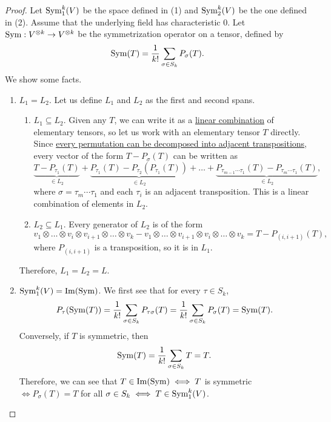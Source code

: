 	\begin{proof}
		Let $\operatorname{Sym}^k_1(V)$ be the space defined in (1) and $\operatorname{Sym}^k_2(V)$ be the one defined in (2). Assume that the underlying field has characteristic $0$. Let $\operatorname{Sym}: V^{\otimes k} \to V^{\otimes k}$ be the symmetrization operator on a tensor, defined by
		\begin{equation}
			\operatorname{Sym}(T) = \frac{1}{k!} \sum_{\sigma \in S_k} P_\sigma(T).
		\end{equation}
		We show some facts.
		\begin{enumerate}
			\item \textit{$L_1 = L_2$}. Let us define $L_1$ and $L_2$ as the first and second spans.
				\begin{enumerate}
					\item $L_1 \subseteq L_2$. Given any $T$, we can write it as a \hyperref[def:linear-combination]{linear combination} of elementary tensors, so let us work with an elementary tensor $T$ directly. Since \hyperref[alg-thm:transposition_decomposition]{every permutation can be decomposed into adjacent transpositions}, every vector of the form $T - P_\sigma(T)$ can be written as
						\begin{equation}
							\underbrace{T - P_{\tau_1}(T)}_{\in L_2}
							+ \underbrace{P_{\tau_1}(T) - P_{\tau_2}(P_{\tau_1}(T))}_{\in L_2}
							+ \ldots
							+ \underbrace{P_{\tau_{m-1} \cdots \tau_1}(T) - P_{\tau_m \cdots \tau_1}(T)}_{\in L_2},
						\end{equation}
						where $\sigma = \tau_m \cdots \tau_1$ and each $\tau_i$ is an adjacent transposition. This is a linear combination of elements in $L_2$.

					\item $L_2 \subseteq L_1$. Every generator of $L_2$ is of the form
						\begin{equation}
							v_1 \otimes \ldots \otimes v_i \otimes v_{i+1} \otimes \ldots \otimes v_k
							- v_1 \otimes \ldots \otimes v_{i+1} \otimes v_i \otimes \ldots \otimes v_k
							= T - P_{(i,i+1)}(T),
						\end{equation}
						where $P_{(i,i+1)}$ is a transposition, so it is in $L_1$.
				\end{enumerate}
				Therefore, $L_1 = L_2 = L$.

			\item \textit{$\operatorname{Sym}^k_1(V) = \operatorname{Im}(\operatorname{Sym})$}. We first see that for every $\tau \in S_k$,
				\begin{equation}
					P_\tau(\operatorname{Sym}(T))
					= \frac{1}{k!} \sum_{\sigma \in S_k} P_{\tau \sigma}(T)
					= \frac{1}{k!} \sum_{\sigma \in S_k} P_\sigma(T)
					= \operatorname{Sym}(T).
				\end{equation}
				Conversely, if $T$ is symmetric, then
				\begin{equation}
					\operatorname{Sym}(T) = \frac{1}{k!} \sum_{\sigma \in S_k} T = T.
				\end{equation}
				Therefore, we can see that $T \in \operatorname{Im}(\operatorname{Sym}) \iff T$ is symmetric $\iff P_\sigma(T) = T$ for all $\sigma \in S_k \iff T \in \operatorname{Sym}^k_1(V)$.


\end{enumerate}
\end{proof}
